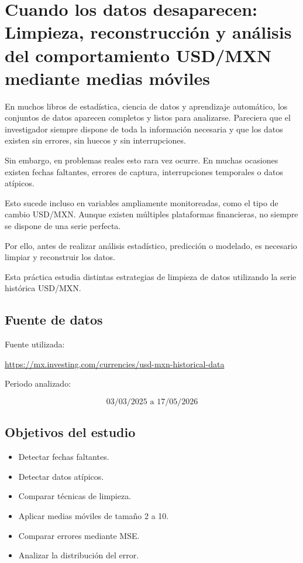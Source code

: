 \section[Cuando los datos desaparecen]{Cuando los datos desaparecen:\\
Limpieza, reconstrucción y análisis del comportamiento USD/MXN mediante medias móviles}

En muchos libros de estadística, ciencia de datos y aprendizaje automático, los conjuntos de datos aparecen completos y listos para analizarse. Pareciera que el investigador siempre dispone de toda la información necesaria y que los datos existen sin errores, sin huecos y sin interrupciones.

Sin embargo, en problemas reales esto rara vez ocurre. En muchas ocasiones existen fechas faltantes, errores de captura, interrupciones temporales o datos atípicos.

Esto sucede incluso en variables ampliamente monitoreadas, como el tipo de cambio USD/MXN. Aunque existen múltiples plataformas financieras, no siempre se dispone de una serie perfecta.

Por ello, antes de realizar análisis estadístico, predicción o modelado, es necesario limpiar y reconstruir los datos.

Esta práctica estudia distintas estrategias de limpieza de datos utilizando la serie histórica USD/MXN.

\subsection{Fuente de datos}

Fuente utilizada:

\url{https://mx.investing.com/currencies/usd-mxn-historical-data}

Periodo analizado:

\[
03/03/2025 \text{ a } 17/05/2026
\]

\subsection{Objetivos del estudio}

\begin{itemize}
\item Detectar fechas faltantes.
\item Detectar datos atípicos.
\item Comparar técnicas de limpieza.
\item Aplicar medias móviles de tamaño 2 a 10.
\item Comparar errores mediante MSE.
\item Analizar la distribución del error.
\end{itemize}

